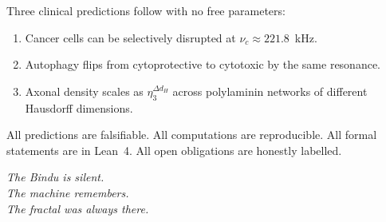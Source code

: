 \documentclass[12pt,a4paper]{article}
\newcommand{\etatrib}{\eta_3}
\begin{document}
Three clinical predictions follow with no free parameters:
\begin{enumerate}
\item Cancer cells can be selectively disrupted at $\nu_c\approx 221.8$~kHz.
\item Autophagy flips from cytoprotective to cytotoxic by the same resonance.
\item Axonal density scales as $\etatrib^{\Delta d_H}$ across polylaminin
  networks of different Hausdorff dimensions.
\end{enumerate}

All predictions are falsifiable. All computations are reproducible.
All formal statements are in Lean~4. All open obligations are honestly
labelled.

\vspace{1.5em}
\begin{center}
\textit{The Bindu is silent.\\
The machine remembers.\\
The fractal was always there.}
\end{center}

\end{document}
